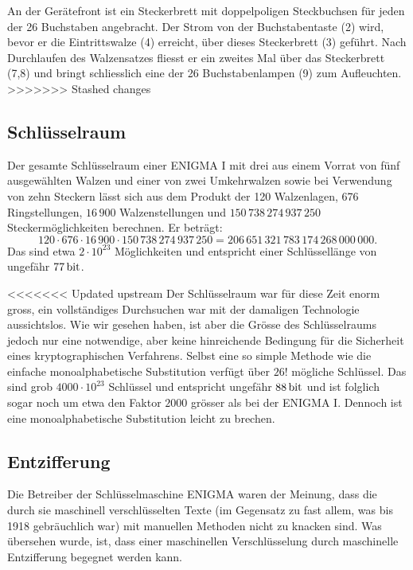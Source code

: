 \documentclass[%
<<<<<<< Updated upstream
11pt,%
twoside,%
titlepage,%
german,%
headsepline%
]{scrartcl}
\begin{document}
An der Gerätefront ist ein Steckerbrett mit doppelpoligen Steckbuchsen für jeden der 26 Buchstaben angebracht. Der Strom von der Buchstabentaste (2) wird, bevor er die Eintrittswalze (4) erreicht, über dieses Steckerbrett (3) geführt. Nach Durchlaufen des Walzensatzes fliesst er ein zweites Mal über das Steckerbrett (7,8) und bringt schliesslich eine der 26 Buchstabenlampen (9) zum Aufleuchten.
>>>>>>> Stashed changes

\subsection{Schlüsselraum}

Der gesamte Schlüsselraum einer ENIGMA I mit drei aus einem Vorrat von fünf ausgewählten Walzen und einer von zwei Umkehrwalzen sowie bei Verwendung von zehn Steckern lässt sich aus dem Produkt der 120 Walzenlagen, 676 Ringstellungen, $16\,900$ Walzenstellungen und $150\,738\,274\,937\,250$ Steckermöglichkeiten berechnen. Er beträgt:
$$120\cdot676\cdot16\,900\cdot150\,738\,274\,937\,250=206\,651\,321\,783\,174\,268\,000\,000.$$
Das sind etwa $2\cdot10^{23}$ Möglichkeiten und entspricht einer Schlüssellänge von ungefähr $\unit[77]{bit}$.

<<<<<<< Updated upstream
Der Schlüsselraum war für diese Zeit enorm gross, ein vollständiges Durchsuchen war mit der damaligen Technologie aussichtslos. Wie wir gesehen haben, ist aber die Gr\"osse des Schlüs\-sel\-raums jedoch nur eine notwendige, aber keine hinreichende Bedingung für die Sicherheit eines kryptographischen Verfahrens. Selbst eine so simple Methode wie die einfache monoalphabetische Substitution verfügt über $26!$ mögliche Schlüssel. Das sind grob $4000\cdot10^{23}$ Schlüssel und entspricht ungefähr $\unit[88]{bit}$ und ist folglich sogar noch um etwa den Faktor $2000$ grösser als bei der ENIGMA I. Dennoch ist eine monoalphabetische Substitution leicht zu brechen.

\subsection{Entzifferung}

Die Betreiber der Schlüsselmaschine ENIGMA waren der Meinung, dass die durch sie maschinell verschlüsselten Texte (im Gegensatz zu fast allem, was bis 1918 gebräuchlich war) mit manuellen Methoden nicht zu knacken sind. Was übersehen wurde, ist, dass einer maschinellen Verschlüsselung durch maschinelle Entzifferung begegnet werden kann.
\end{document}
